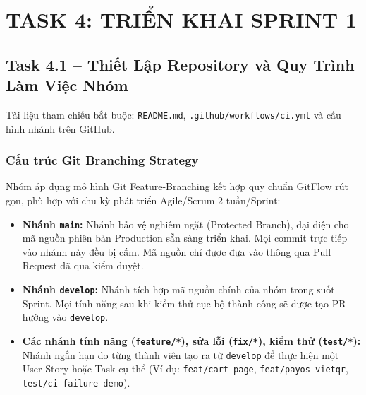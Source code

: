\documentclass[11pt,a4paper]{article}
\begin{document}
\section{TASK 4: TRIỂN KHAI SPRINT 1}

\subsection{Task 4.1 -- Thiết Lập Repository và Quy Trình Làm Việc Nhóm}

Tài liệu tham chiếu bắt buộc: \texttt{README.md}, \texttt{.github/workflows/ci.yml} và cấu hình nhánh trên GitHub.

\subsubsection{Cấu trúc Git Branching Strategy}
Nhóm áp dụng mô hình Git Feature-Branching kết hợp quy chuẩn GitFlow rút gọn, phù hợp với chu kỳ phát triển Agile/Scrum 2 tuần/Sprint:
\begin{itemize}[leftmargin=*]
    \item \textbf{Nhánh \texttt{main}:} Nhánh bảo vệ nghiêm ngặt (Protected Branch), đại diện cho mã nguồn phiên bản Production sẵn sàng triển khai. Mọi commit trực tiếp vào nhánh này đều bị cấm. Mã nguồn chỉ được đưa vào thông qua Pull Request đã qua kiểm duyệt.
    \item \textbf{Nhánh \texttt{develop}:} Nhánh tích hợp mã nguồn chính của nhóm trong suốt Sprint. Mọi tính năng sau khi kiểm thử cục bộ thành công sẽ được tạo PR hướng vào \texttt{develop}.
    \item \textbf{Các nhánh tính năng (\texttt{feature/*}), sửa lỗi (\texttt{fix/*}), kiểm thử (\texttt{test/*}):} Nhánh ngắn hạn do từng thành viên tạo ra từ \texttt{develop} để thực hiện một User Story hoặc Task cụ thể (Ví dụ: \texttt{feat/cart-page}, \texttt{feat/payos-vietqr}, \texttt{test/ci-failure-demo}).
\end{itemize}
\end{document}
